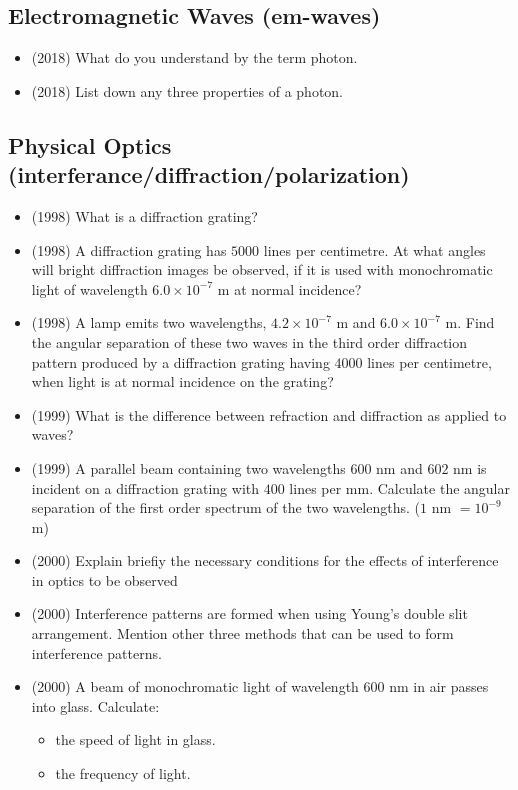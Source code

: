 \documentclass{article}
\begin{document}
\subsection{Electromagnetic Waves (em-waves)}
\begin{itemize}
\item (2018)  What do you understand by the term photon. 
\item (2018)  List down any three properties of a photon. 
\end{itemize}

\subsection{Physical Optics (interferance/diffraction/polarization)}
\begin{itemize}
\item (1998)  What is a diffraction grating?
\item (1998)  A diffraction grating has $ 5000$ lines per centimetre. At what angles will bright diffraction images be observed, if it is used with monochromatic light of wavelength $ 6.0 \times 10^{-7}$ m at normal incidence?
\item (1998)  A lamp emits two wavelengths, $ 4.2 \times 10^{-7}$ m and $ 6.0 \times 10^{-7}$ m. Find the angular separation of these two waves in the third order diffraction pattern produced by a diffraction grating having $ 4000$ lines per centimetre, when light is at normal incidence on the grating?
\item (1999)  What is the difference between refraction and diffraction as applied to waves?
\item (1999)  A parallel beam containing two wavelengths $ 600$ nm and $ 602$ nm is incident on a diffraction grating with $ 400$ lines per mm. Calculate the angular separation of the first order spectrum of the two wavelengths. ($ 1$ nm $ =10^{-9}$ m)
\item (2000)  Explain briefiy the necessary conditions for the effects of interference in optics to be observed
\item (2000)  Interference patterns are formed when using Young’s double slit arrangement. Mention other three methods that can be used to form interference patterns.
\item (2000)  A beam of monochromatic light of wavelength $ 600$ nm in air passes into glass. Calculate:
 \begin{itemize}
\item the speed of light in glass.
\item the frequency of light.

\end{itemize}
\end{itemize}
\end{document}
